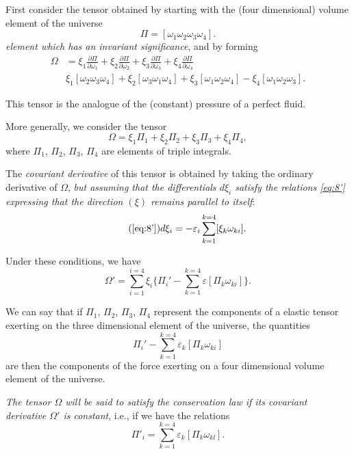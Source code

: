 \documentclass[leqno,12pt]{article}
\makeatletter
\let\old@epsilon\epsilon
\let\old@varepsilon\varepsilon
\let\epsilon\old@varepsilon
\let\varepsilon\old@epsilon
\newcommand{\pd}{\partial}
\theoremstyle{shape1}
\theoremstyle{shape0}
\theoremstyle{shape2}
\theoremstyle{definition}
\makeatother
\begin{document}
First consider the tensor obtained by starting with the (four dimensional) volume element of the universe
\[
\Pi=[\omega_{1}\omega_{2}\omega_{3}\omega_{4}].
\]
\emph{element which has an invariant significance}, and by forming
\begin{align*}
  \Omega&=\xi_{1}\frac{\pd \Pi}{\pd \omega_{1}}+\xi_{2}\frac{\pd \Pi}{\pd \omega_{2}}+\xi_{3}\frac{\pd \Pi}{\pd \omega_{3}}+\xi_{4}\frac{\pd \Pi}{\pd\omega_{4}}\\
  &\xi_{1}[\omega_{2}\omega_{3}\omega_{4}]+\xi_{2}[\omega_{3}\omega_{1}\omega_{4}]+\xi_{3}[\omega_{1}\omega_{2}\omega_{4}]-\xi_{4}[\omega_{1}\omega_{2}\omega_{3}].
\end{align*}

This tensor is the analogue of the (constant) pressure of a perfect fluid.

More generally, we consider the tensor
\[
\Omega=\xi_{1}\Pi_{1}+\xi_{2}\Pi_{2}+\xi_{3}\Pi_{3}+\xi_{4}\Pi_{4},
\]
where $\Pi_{1}$, $\Pi_{2}$, $\Pi_{3}$, $\Pi_{4}$ are elements of triple integrals.

The \emph{covariant derivative} of this tensor is obtained by taking the ordinary derivative of $\Omega$, \emph{but assuming that the differentials $d\xi_{i}$ satisfy the relations \eqref{eq:8'} expressing that the direction $(\xi)$ remains parallel to itself}:
\begin{equation}
  \label{eq:8b}\tag{\ref{eq:8'}}
  d\xi_{i}=-\epsilon_{i}\sum_{k=1}^{k=4}[\xi_{k}\omega_{ki}].
\end{equation}

Under these conditions, we have
\[
\Omega'=\sum_{i=1}^{i=4}\xi_{i}\bigg\{\Pi_{i}'-\sum_{k=1}^{k=4}\epsilon[\Pi_{k}\omega_{ki}]\bigg\}.
\]

We can say that if $\Pi_{1}$, $\Pi_{2}$, $\Pi_{3}$, $\Pi_{4}$ represent the components of a elastic tensor exerting on the three dimensional element of the universe, the quantities
\[
\Pi_{i}'-\sum_{k=1}^{k=4}\epsilon_{k}[\Pi_{k}\omega_{ki}]
\]
are then the components of the force exerting on a four dimensional volume element of the universe.

\emph{The tensor $\Omega$ will be said to satisfy the conservation law if its covariant derivative $\Omega'$ is constant}, i.e., if we have the relations
\[
\Pi'_{i}=\sum_{k=1}^{k=4}\epsilon_{k}[\Pi_{k}\omega_{kl}].
\]
\end{document}

